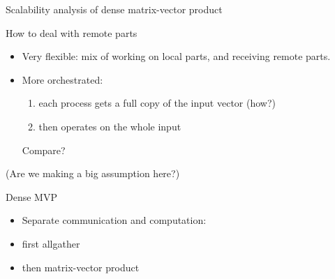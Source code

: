 
 {Scalability analysis of dense matrix-vector product}



\begin{frame}{How to deal with remote parts}
  \begin{itemize}
  \item Very flexible: mix of working on local parts, and receiving remote parts.
  \item More orchestrated:
    \begin{enumerate}
    \item
      each process gets a full copy of the input vector (how?)
    \item then operates on the whole input
    \end{enumerate}
    Compare?
  \end{itemize}
  (Are we making a big assumption here?)
\end{frame}

\begin{frame}{Dense MVP}
\begin{itemize}
\item Separate communication and computation:
\item first allgather
\item then matrix-vector product
\end{itemize}
\end{frame}

